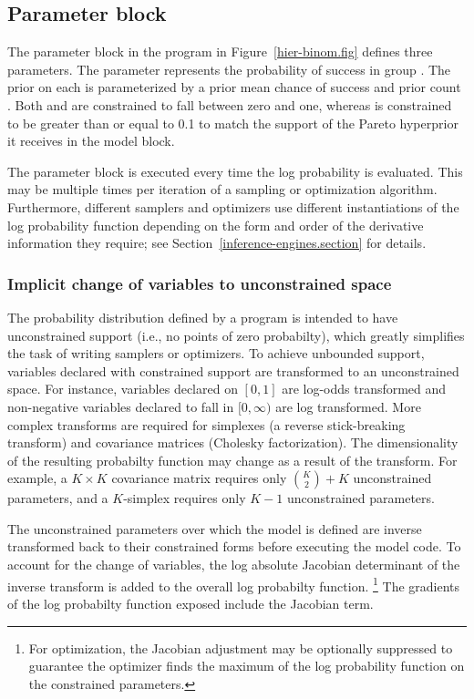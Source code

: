 \documentclass[article]{jss}
\begin{document}
\subsection{Parameter block}

The parameter block in the program in Figure~\ref{hier-binom.fig}
defines three parameters.  The parameter  represents
the probability of success in group .  The prior on each
 is parameterized by a prior mean chance of success
 and prior count .  Both  and
 are constrained to fall between zero and one, whereas
 is constrained to be greater than or equal to 0.1 to
match the support of the Pareto hyperprior it receives in the model block.

The parameter block is executed every time the log probability is
evaluated.  This may be multiple times per iteration of a sampling or
optimization algorithm.  Furthermore, different samplers and
optimizers use different instantiations of the log probability
function depending on the form and order of the derivative information
they require; see Section~\ref{inference-engines.section} for
details. 

\subsubsection{Implicit change of variables to unconstrained space}

The probability distribution defined by a  program is
intended to have unconstrained support (i.e., no points of zero
probabilty), which greatly simplifies the task of
writing samplers or optimizers.  To achieve unbounded support,
variables declared with constrained support are transformed 
to an unconstrained space.  For
instance, variables declared on $[0,1]$ are log-odds transformed and
non-negative variables declared to fall in $[0,\infty)$ are log
transformed.  More complex transforms are required for simplexes (a
reverse stick-breaking transform) and covariance matrices (Cholesky
factorization).  The dimensionality of the resulting probabilty
function may change as a result of the transform. For example, a $K
\times K$ covariance matrix requires only ${K \choose 2} + K$
unconstrained parameters, and a $K$-simplex requires only $K-1$
unconstrained parameters.

The unconstrained parameters over which the model is defined are
inverse transformed back to their constrained forms before executing
the model code.  To account for the change of variables, the log
absolute Jacobian determinant of the inverse transform is added to the
overall log probabilty function.%
%
\footnote{For optimization, the Jacobian adjustment may be optionally
  suppressed to guarantee the optimizer finds the maximum of the log
  probability function on the constrained parameters.}
%
The gradients of the log probabilty function exposed include the
Jacobian term.  
\end{document}
